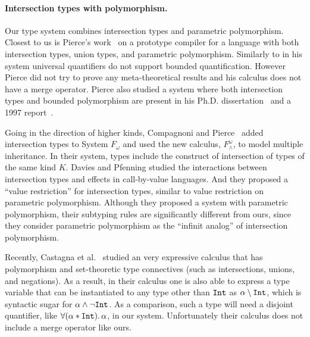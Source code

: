




\paragraph{Intersection types with polymorphism.}
Our type system combines intersection types and parametric polymorphism. Closest
to us is Pierce's work~\cite{pierce1991programming1} on a prototype
compiler for a language with both intersection types, union types, and
parametric polymorphism. Similarly to \namedis in his system universal
quantifiers do not support bounded quantification. However Pierce did not try to prove any
meta-theoretical results and his calculus does not have a merge
operator.  Pierce also studied a system where both intersection
types and bounded polymorphism are present in his Ph.D.
dissertation~\cite{pierce1991programming2} and a 1997
report~\cite{pierce1997intersection}.

Going in the direction of higher
kinds, Compagnoni and Pierce~\cite{compagnoni1996higher} added
intersection types to System $ F_{\omega} $ and used the new calculus,
$ F^{\omega}_{\wedge} $, to model multiple inheritance. In their
system, types include the construct of intersection of types of the
same kind $ K $. Davies and Pfenning
\cite{davies2000intersection} studied the interactions between
intersection types and effects in call-by-value languages. And they
proposed a ``value restriction'' for intersection types, similar to
value restriction on parametric polymorphism. Although they proposed a system with
parametric polymorphism, their subtyping rules are significantly different from ours,
since they consider parametric polymorphism
as the ``infinit analog'' of intersection polymorphism.

Recently,
Castagna et al.~\cite{Castagna:2014} studied an very expressive calculus that
has polymorphism and set-theoretic type connectives (such as intersections,
unions, and negations). As a result, in their calculus one is also able to
express a type variable that can be instantiated to any type other than
$\texttt{Int}$ as $\alpha \setminus \texttt{Int}$, which is syntactic sugar for
$\alpha \wedge \neg \texttt{Int}$. As a comparison, such a type will need a
disjoint quantifier, like $\forall (\alpha * \texttt{Int}).\, \alpha$, in our system.
Unfortunately their calculus does not include a merge operator like ours.

